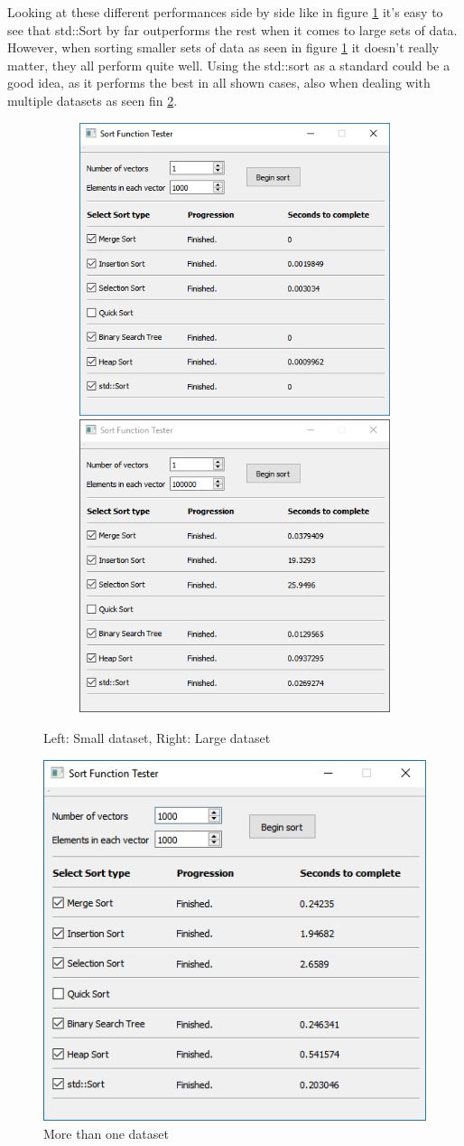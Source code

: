 \documentclass{article}
\begin{document}
Looking at these different performances side by side like in figure \ref{fig:dataset} it's easy to see that std::Sort by far outperforms the rest when it comes to large sets of data. However, when sorting smaller sets of data as seen in figure \ref{fig:dataset} it doesn't really matter, they all perform quite well. Using the std::sort as a standard could be a good idea, as it performs the best in all shown cases, also when dealing with multiple datasets as seen fin \ref{fig:several-vectors}.
\begin{figure}[h]
	\begin{subfigure}{\linewidth}
		\includegraphics[width=0.5\linewidth]{"images/small dataset"}\hfill
		\includegraphics[width=0.5\linewidth]{"images/large dataset"}\hfill
	\end{subfigure}\par\medskip
	\label{fig:dataset}
	\caption{Left: Small dataset, Right: Large dataset}
\end{figure}

\begin{figure}
	\centering
	\includegraphics[width=0.7\linewidth]{"images/several vectors"}
	\caption{More than one dataset}
	\label{fig:several-vectors}
\end{figure}
\end{document}
